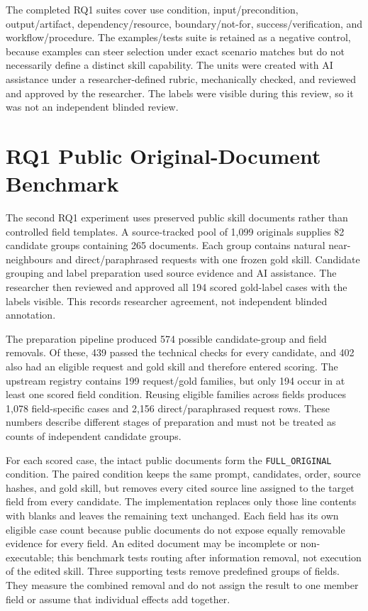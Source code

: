 The completed RQ1 suites cover use condition, input/precondition, output/artifact, dependency/resource, boundary/not-for, success/verification, and workflow/procedure. The examples/tests suite is retained as a negative control, because examples can steer selection under exact scenario matches but do not necessarily define a distinct skill capability. The units were created with AI assistance under a researcher-defined rubric, mechanically checked, and reviewed and approved by the researcher. The labels were visible during this review, so it was not an independent blinded review.

\section{RQ1 Public Original-Document Benchmark}

The second RQ1 experiment uses preserved public skill documents rather than controlled field templates. A source-tracked pool of 1,099 originals supplies 82 candidate groups containing 265 documents. Each group contains natural near-neighbours and direct/paraphrased requests with one frozen gold skill. Candidate grouping and label preparation used source evidence and AI assistance. The researcher then reviewed and approved all 194 scored gold-label cases with the labels visible. This records researcher agreement, not independent blinded annotation.

The preparation pipeline produced 574 possible candidate-group and field removals. Of these, 439 passed the technical checks for every candidate, and 402 also had an eligible request and gold skill and therefore entered scoring. The upstream registry contains 199 request/gold families, but only 194 occur in at least one scored field condition. Reusing eligible families across fields produces 1,078 field-specific cases and 2,156 direct/paraphrased request rows. These numbers describe different stages of preparation and must not be treated as counts of independent candidate groups.

For each scored case, the intact public documents form the \texttt{FULL\_ORIGINAL} condition. The paired condition keeps the same prompt, candidates, order, source hashes, and gold skill, but removes every cited source line assigned to the target field from every candidate. The implementation replaces only those line contents with blanks and leaves the remaining text unchanged. Each field has its own eligible case count because public documents do not expose equally removable evidence for every field. An edited document may be incomplete or non-executable; this benchmark tests routing after information removal, not execution of the edited skill. Three supporting tests remove predefined groups of fields. They measure the combined removal and do not assign the result to one member field or assume that individual effects add together.

